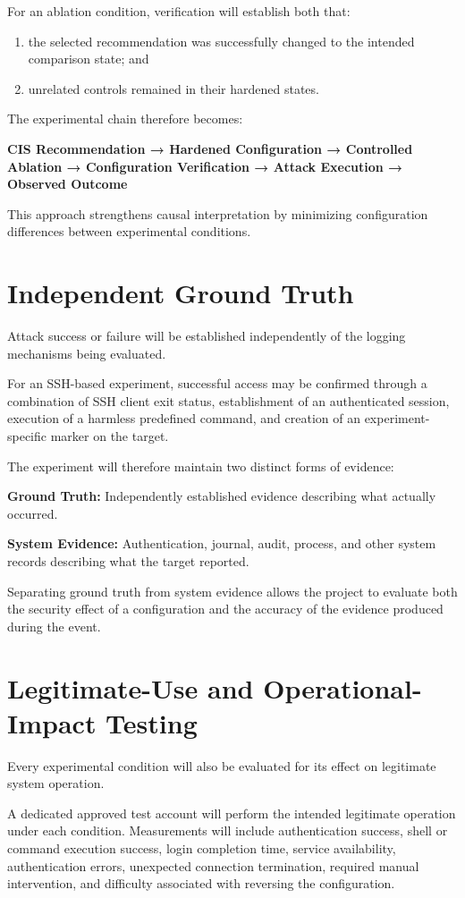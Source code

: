 \documentclass[11pt]{article}
\begin{document}
For an ablation condition, verification will establish both that:

\begin{enumerate}
\item the selected recommendation was successfully changed to the intended
comparison state; and
\item unrelated controls remained in their hardened states.
\end{enumerate}

The experimental chain therefore becomes:


\textbf{CIS Recommendation → Hardened Configuration → Controlled Ablation →
Configuration Verification → Attack Execution → Observed Outcome}


This approach strengthens causal interpretation by minimizing
configuration differences between experimental conditions.
\section{Independent Ground Truth}
\label{sec:org3a435f9}
Attack success or failure will be established independently of the
logging mechanisms being evaluated.

For an SSH-based experiment, successful access may be confirmed through
a combination of SSH client exit status, establishment of an
authenticated session, execution of a harmless predefined command, and
creation of an experiment-specific marker on the target.

The experiment will therefore maintain two distinct forms of evidence:

\textbf{Ground Truth:} Independently established evidence describing what
actually occurred.

\textbf{System Evidence:} Authentication, journal, audit, process, and other
system records describing what the target reported.

Separating ground truth from system evidence allows the project to
evaluate both the security effect of a configuration and the accuracy of
the evidence produced during the event.
\section{Legitimate-Use and Operational-Impact Testing}
\label{sec:orgcb5c02e}
Every experimental condition will also be evaluated for its effect on
legitimate system operation.

A dedicated approved test account will perform the intended legitimate
operation under each condition. Measurements will include authentication
success, shell or command execution success, login completion time,
service availability, authentication errors, unexpected connection
termination, required manual intervention, and difficulty associated
with reversing the configuration.
\end{document}

